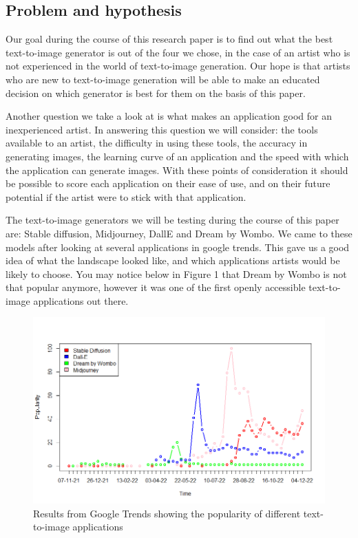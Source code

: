 \documentclass[]{report}
\begin{document}
	\subsection{Problem and hypothesis}
Our goal during the course of this research paper is to find out what the best text-to-image generator is out of the four we chose, in the case of an artist who is not experienced in the world of text-to-image generation. Our hope is that artists who are new to text-to-image generation will be able to make an educated decision on which generator is best for them on the basis of this paper.

Another question we take a look at is what makes an application good for an inexperienced artist. In answering this question we will consider: the tools available to an artist, the difficulty in using these tools, the accuracy in generating images, the learning curve of an application and the speed with which the application can generate images. With these points of consideration it should be possible to score each application on their ease of use, and on their future potential if the artist were to stick with that application.

The text-to-image generators we will be testing during the course of this paper are: Stable diffusion, Midjourney, DallE and Dream by Wombo. We came to these models after looking at several applications in google trends. This gave us a good idea of what the landscape looked like, and which applications artists would be likely to choose. You may notice below in Figure 1 that Dream by Wombo is not that popular anymore, however it was one of the first openly accessible text-to-image applications out there.

\begin{figure}[!h]
	\centering
	\includegraphics[width=1\linewidth]{TrendsPlotWithLegend}
	\caption{Results from Google Trends showing the popularity of different text-to-image applications}
	\label{fig:TrendsPlotWithLegend}
\end{figure}
\end{document}

